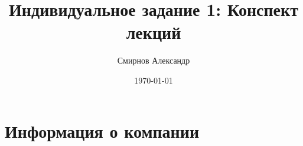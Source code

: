 \documentclass[a4paper,8pt]{article}
\title{Индивидуальное задание 1: Конспект лекций}
\author{ Смирнов Александр }
\date{\today}
\begin{document}
\maketitle


\section{Информация о компании}
\end{document}
